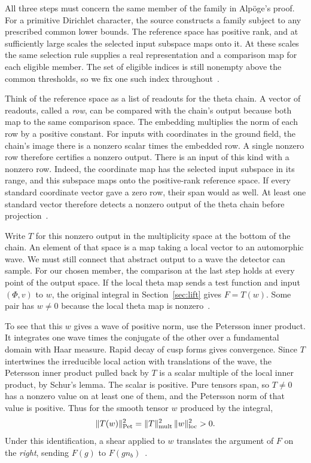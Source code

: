 \documentclass[11pt,letterpaper]{article}
\numberwithin{equation}{section}
\begin{document}
All three steps must concern the same member of the family in Alp\"oge's proof. For a primitive Dirichlet character, the source constructs a family subject to any prescribed common lower bounds. The reference space has positive rank, and at sufficiently large scales the selected input subspace maps onto it. At these scales the same selection rule supplies a real representation and a comparison map for each eligible member. The set of eligible indices is still nonempty above the common thresholds, so we fix one such index throughout~\cite{shearfamily,shearrow,shearjoin}.

Think of the reference space as a list of readouts for the theta chain. A vector of readouts, called a \emph{row}, can be compared with the chain's output because both map to the same comparison space. The embedding multiplies the norm of each row by a positive constant. For inputs with coordinates in the ground field, the chain's image there is a nonzero scalar times the embedded row. A single nonzero row therefore certifies a nonzero output. There is an input of this kind with a nonzero row. Indeed, the coordinate map has the selected input subspace in its range, and this subspace maps onto the positive-rank reference space. If every standard coordinate vector gave a zero row, their span would as well. At least one standard vector therefore detects a nonzero output of the theta chain before projection~\cite{shearrow,shearjoin}.

Write $T$ for this nonzero output in the multiplicity space at the bottom of the chain. An element of that space is a map taking a local vector to an automorphic wave. We must still connect that abstract output to a wave the detector can sample. For our chosen member, the comparison at the last step holds at every point of the output space. If the local theta map sends a test function and input $(\Phi,v)$ to $w$, the original integral in Section~\ref{sec:lift} gives $F=T(w)$. Some pair has $w\ne0$ because the local theta map is nonzero~\cite{shearjoin,shearraw}.

To see that this $w$ gives a wave of positive norm, use the Petersson inner product. It integrates one wave times the conjugate of the other over a fundamental domain with Haar measure. Rapid decay of cusp forms gives convergence. Since $T$ intertwines the irreducible local action with translations of the wave, the Petersson inner product pulled back by $T$ is a scalar multiple of the local inner product, by Schur's lemma. The scalar is positive. Pure tensors span, so $T\ne0$ has a nonzero value on at least one of them, and the Petersson norm of that value is positive. Thus for the smooth tensor $w$ produced by the integral,
\[
 \|T(w)\|_{\rm Pet}^2=\|T\|_{\rm mult}^2\,\|w\|_{\rm loc}^2>0 .
\]
Under this identification, a shear applied to $w$ translates the argument of $F$ on the \emph{right}, sending $F(g)$ to $F(g n_b)$~\cite{thetaoriginal,shearmetric}.
\end{document}
